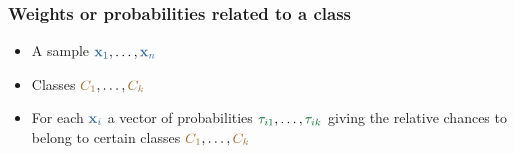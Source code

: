 \begin{frame}[t]
\frametitle{Weights or probabilities related to a class}

\begin{itemize}
\item A sample $\obs{\textbf{x}_1}, \dots, \obs{\textbf{x}_n}$
\item Classes $\class{C_1}, \dots, \class{C_k}$
\item<3-> For each $\obs{\textbf{x}_i}$ a vector of probabilities $\post{\tau_{i1}}, \dots, \post{\tau_{ik}}$ giving the relative chances to belong to certain classes $\class{C_1}, \dots, \class{C_k}$
\end{itemize}

\bigskip
\begin{center}

\end{center}
\end{frame}


